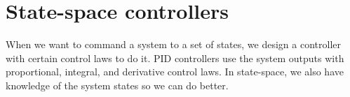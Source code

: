 
\chapter{State-space controllers}

When we want to command a \gls{system} to a set of states, we design a
controller with certain \glspl{control law} to do it. PID controllers use the
system outputs with proportional, integral, and derivative \glspl{control law}.
In state-space, we also have knowledge of the system states so we can do better.











